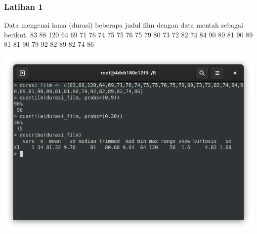 \documentclass[a4paper,12pt]{article}
\begin{document}
\subsubsection{Latihan 1}
Data mengenai lama (durasi) beberapa judul film dengan data mentah sebagai berikut. 83 88 120 64 69 71 76 74 75 75 76 75 79 80 73 72 82 74 84 90 89 81 90 89 81 81 90 79 92 82 89 82 74 86
\begin{center}
	\includegraphics[scale=.5]{lat1}
\end{center}
\end{document}
